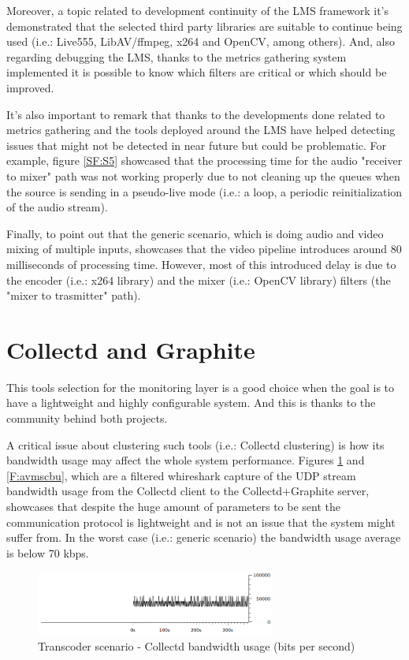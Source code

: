 Moreover, a topic related to development continuity of the LMS framework it's demonstrated that the selected third party libraries are suitable to continue being used (i.e.: Live555, LibAV/ffmpeg, x264 and OpenCV, among others). And, also regarding debugging the LMS, thanks to the metrics gathering system implemented it is possible to know which filters are critical or which should be improved.

It's also important to remark that thanks to the developments done related to metrics gathering and the tools deployed around the LMS have helped detecting issues that might not be detected in near future but could be problematic. For example, figure \ref{SF:S5} showcased that the processing time for the audio "receiver to mixer" path was not working properly due to not cleaning up the queues when the source is sending in a pseudo-live mode (i.e.: a loop, a periodic reinitialization of the audio stream).

Finally, to point out that the generic scenario, which is doing audio and video mixing of multiple inputs, showcases that the video pipeline introduces around 80 milliseconds of processing time. However, most of this introduced delay is due to the encoder (i.e.: x264 library) and the mixer (i.e.: OpenCV library) filters (the "mixer to trasmitter" path).

\section{Collectd and Graphite}

This tools selection for the monitoring layer is a good choice when the goal is to have a lightweight and highly configurable system. And this is thanks to the community behind both projects.

A critical issue about clustering such tools (i.e.: Collectd clustering) is how its bandwidth usage may affect the whole system performance. Figures \ref{F:tscbu} and \ref{F:avmscbu}, which are a filtered whireshark capture of the UDP stream bandwidth usage from the Collectd client to the Collectd+Graphite server, showcases that despite the huge amount of parameters to be sent the communication protocol is lightweight and is not an issue that the system might suffer from. In the worst case (i.e.: generic scenario) the bandwidth usage average is below 70 kbps.

\begin{figure}[!htb]
\begin{center}
\includegraphics[width=0.70\textwidth]{./images/testStats/testStatsDocker/collectdBWbits.png}
\caption{Transcoder scenario - Collectd bandwidth usage (bits per second)}
\label{F:tscbu}
\end{center}
\end{figure}

